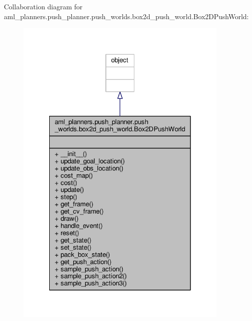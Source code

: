 Collaboration diagram for aml\-\_\-planners.\-push\-\_\-planner.\-push\-\_\-worlds.\-box2d\-\_\-push\-\_\-world.\-Box2\-D\-Push\-World\-:\nopagebreak
\begin{figure}[H]
\begin{center}
\leavevmode
\includegraphics[width=294pt]{classaml__planners_1_1push__planner_1_1push__worlds_1_1box2d__push__world_1_1_box2_d_push_world__coll__graph}
\end{center}
\end{figure}
